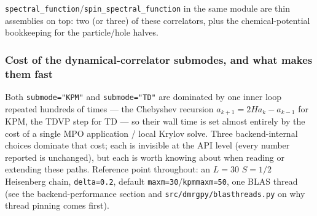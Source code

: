 \documentclass[11pt]{article}
\begin{document}
\texttt{spectral\_function}/\texttt{spin\_spectral\_function} in the same
module are thin assemblies on top: two (or three) of these correlators,
plus the chemical-potential bookkeeping for the particle/hole halves.

\subsubsection{Cost of the dynamical-correlator submodes, and what makes
them fast}

Both \texttt{submode="KPM"} and \texttt{submode="TD"} are dominated by one
inner loop repeated hundreds of times --- the Chebyshev recursion
$a_{k+1}=2Ha_k-a_{k-1}$ for KPM, the TDVP step for TD --- so their wall
time is set almost entirely by the cost of a single MPO application /
local Krylov solve. Three backend-internal choices dominate that cost;
each is invisible at the API level (every number reported is unchanged),
but each is worth knowing about when reading or extending these paths.
Reference point throughout: an $L=30$ $S=1/2$ Heisenberg chain,
\texttt{delta=0.2}, default \texttt{maxm=30}/\texttt{kpmmaxm=50}, one BLAS
thread (see the backend-performance section and
\texttt{src/dmrgpy/blasthreads.py} on why thread pinning comes first).
\end{document}
